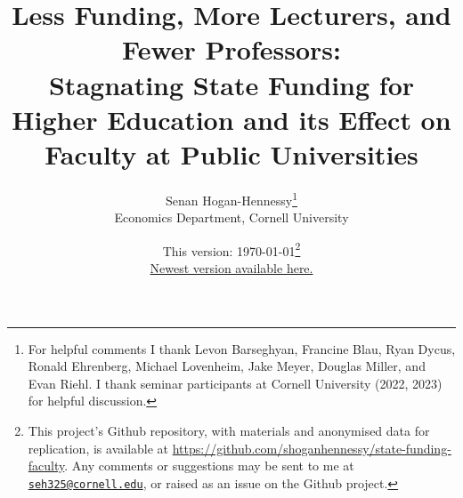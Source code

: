 \documentclass[notitlepage,12pt]{article}
\author{Senan Hogan-Hennessy\thanks{
        For helpful comments I thank
        Levon Barseghyan,
        Francine Blau,
        Ryan Dycus,
        Ronald Ehrenberg,
        Michael Lovenheim,
        Jake Meyer,
        Douglas Miller,
        and Evan Riehl.
        I thank seminar participants at Cornell University (2022, 2023) for helpful discussion.} \\
    \vspace{0.1cm}
    Economics Department, Cornell University
}
\title{Less Funding, More Lecturers, and Fewer Professors: \\ \vspace{0.1cm}
    \Large{Stagnating State Funding for Higher Education and its Effect on Faculty at Public Universities}}
\date{This version: \today\thanks{
    This project's Github repository, with materials and anonymised data for replication, is available at 
    \url{https://github.com/shoganhennessy/state-funding-faculty}.
    Any comments or suggestions may be sent to me at \href{mailto:seh325@cornell.edu}{\nolinkurl{seh325@cornell.edu}}, or raised as an issue on the Github project.
    } \\ \vspace{0.1cm}
    \href{https://github.com/shoganhennessy/state-funding-faculty/blob/main/state-funding-faculty-2023.pdf}{Newest version available here.}
}
\begin{document}
\maketitle
\thispagestyle{empty}
\begin{abstract}
    \noindent
    
\end{abstract}

\newpage
\setcounter{page}{1}
\doublespacing
\noindent








\singlespacing



\newpage



\end{document}
